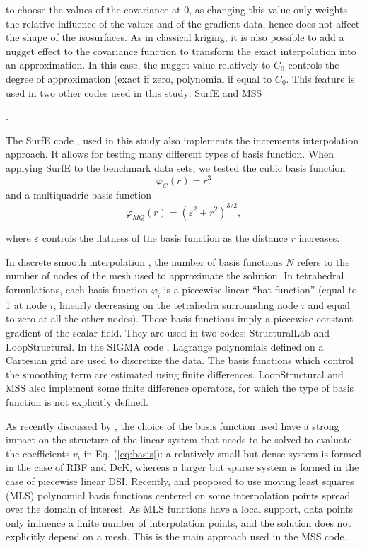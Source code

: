 \documentclass[preprint]{ring20}
\begin{document}
to choose the values of the covariance at 0, as changing this value only weights the relative influence of the values and of the gradient data, hence does not affect the shape of the isosurfaces. As in classical kriging, it is also possible to add a nugget effect to the covariance function to transform the exact interpolation into an approximation. In this case, the nugget value relatively to $C_0$ controls the degree of approximation (exact if zero, polynomial if equal to $C_0$. This feature is used in two other codes used in this study: SurfE \citep{Hillier2014MG} and MSS {\citep{Renaudeau2019MG}. 

The SurfE code \citep{Hillier2014MG}, used in this study also implements the increments interpolation approach. It allows for testing many different types of basis function. When applying SurfE to the benchmark data sets, we tested the cubic basis function 
\begin{equation}
\varphi_{C}(r) = r^3
\end{equation}
and a multiquadric basis function
\begin{equation}
\varphi_{MQ}(r) = (\varepsilon^2 + r^2)^{3/2},
\end{equation}

where $\varepsilon$ controls the flatness of the basis function as the distance $r$ increases. 

In discrete smooth interpolation \citep[DSI, ][]{Frank2007CG,Caumon2013GaRSITo,Souche20137ECEISE2,Laurent2016MG,Irakarama2018EAGE}, the number of basis functions $N$ refers to the number of nodes of the mesh used to approximate the solution. In tetrahedral formulations, each basis function $\varphi_i$ is a piecewise linear ``hat function'' (equal to 1 at node $i$, linearly decreasing on the tetrahedra surrounding node $i$ and equal to zero at all the other nodes). These basis functions imply a piecewise constant gradient of the scalar field. They are used in two codes: StructuralLab \citep{Frank2007CG,Caumon2013GaRSITo} and LoopStructural. 
In the SIGMA code \cite{Irakarama2018EAGE}, Lagrange polynomials defined on a Cartesian grid are used to discretize the data. The basis functions which control the smoothing term are estimated using finite differences. LoopStructural and MSS also implement some finite difference operators, for which the type of basis function is not explicitly defined. 

As recently discussed by \citet{Renaudeau2019MG}, the choice of the basis function used have a strong impact on the structure of the linear system that needs to be solved to evaluate the coefficients $v_i$ in Eq. (\ref{eq:basis}): a relatively small but dense system is formed in the case of RBF and DcK, whereas a larger but sparse system is formed in the case of piecewise linear DSI. Recently, \citet{Renaudeau2019MG} and \citet{Manchuk2019CG} proposed to use moving least squares (MLS) polynomial basis functions centered on some interpolation points spread over the domain of interest. As MLS functions have a local support, data points only influence a finite number of interpolation points, and the solution does not explicitly depend on a mesh. This is the main approach used in the MSS code. 

}
\end{document}
